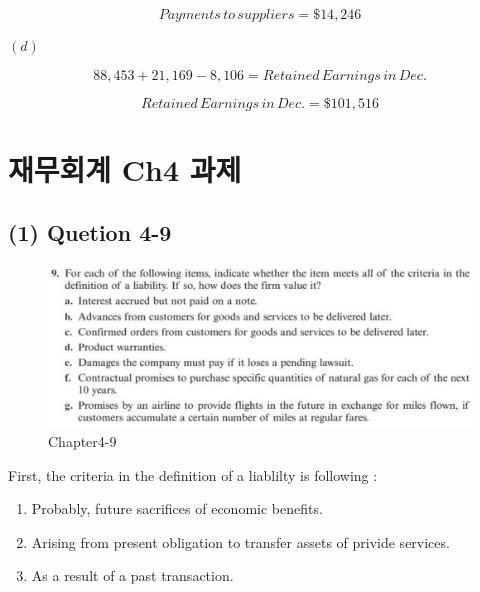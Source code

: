 \documentclass[
  a4paper,
  DIV=11,
  numbers=noendperiod]{scrreprt}
\providecommand{\tightlist}{%
  \setlength{\itemsep}{0pt}\setlength{\parskip}{0pt}}\usepackage{longtable,booktabs,array}
\begin{document}
\[Payments\,to\,suppliers=\$14,246\]

\textbf{\((d)\)}

\[88,453+21,169-8,106=Retained\,Earnings\,in\,Dec.\]

\[Retained\,Earnings\,in\,Dec.=\$101,516\]

\chapter*{재무회계 Ch4
과제}\label{uxc7acuxbb34uxd68cuxacc4-ch4-uxacfcuxc81c}


\section*{(1) Quetion 4-9}\label{quetion-4-9}


\begin{figure}[H]

{\centering \includegraphics{images/재무회계_4-9.png}

}

\caption{Chapter4-9}

\end{figure}%

First, the criteria in the definition of a liablilty is following :

\begin{enumerate}
\def\labelenumi{(\arabic{enumi})}
\tightlist
\item
  Probably, future sacrifices of economic benefits.
\item
  Arising from present obligation to transfer assets of privide
  services.
\item
  As a result of a past transaction.
\end{enumerate}
\end{document}
